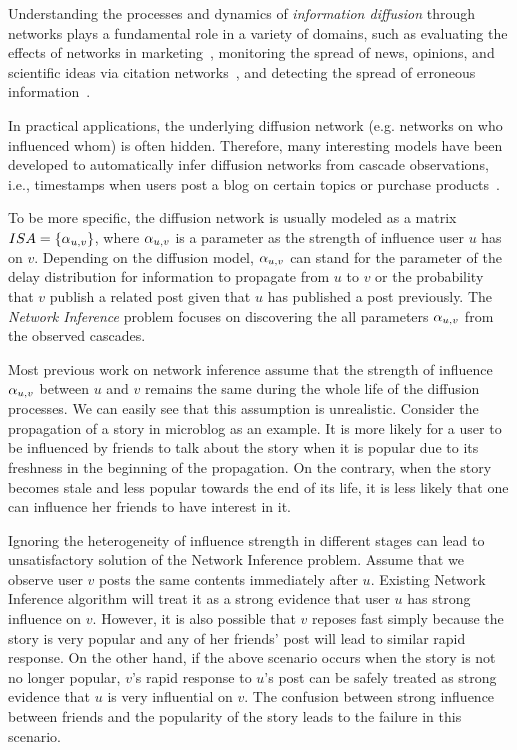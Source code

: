 
\quad Understanding the processes and dynamics of \emph{information diffusion} through networks plays a fundamental role in a variety of domains, such as evaluating the effects of networks in marketing~\cite{domingos:2001,kempe:2003,leskovec:2007a}, monitoring the spread of news, opinions, and scientific ideas via citation networks~\cite{adar:2004,gruhl:2004,leskovec:2005}, and detecting the spread of erroneous information~\cite{dong:2009}.

In practical applications, the underlying diffusion network (e.g. networks on who influenced whom) is often hidden. Therefore, many interesting models have been developed to automatically infer diffusion networks from cascade observations, i.e., timestamps when users post a blog on certain topics or purchase products~\cite{gomez-rodriguez:leskovec:krause:inferring,gomez-rodriguez:balduzzi:schoelkopf:uncovering,yang:zha:mutualExciting,zhou:zha:song:mutualExciting,Wang:Hu:Philip:Li:multiAspect,Daneshmand:Gomez:Song:recovery14,Du:Song:Song:Alex:HeterogeneousInf,Du:Song:Woo:Zha:topicCascade}. 


To be more specific, the diffusion network is usually modeled as a matrix $ISA=\{\alpha_{u,v}\}$, where $\alpha_{u,v}$ is a parameter as the strength of influence user $u$ has on $v$. Depending on the diffusion model, $\alpha_{u,v}$ can stand for the parameter of the delay distribution for information to propagate from $u$ to $v$ or the probability that $v$ publish a related post given that $u$ has published a post previously. The \emph{Network Inference} problem focuses on discovering the all parameters $\alpha_{u,v}$ from the observed cascades. 



Most previous work on network inference assume that the strength of influence $\alpha_{u,v}$ between $u$ and $v$ remains the same during the whole life of the diffusion processes. We can easily see that this assumption is unrealistic. Consider the propagation of a story in microblog as an example. It is more likely for a user to be influenced by friends to talk about the story when it is popular due to its freshness in the beginning of the propagation. On the contrary, when the story becomes stale and less popular towards the end of its life, it is less likely that one can influence her friends to have interest in it. 


Ignoring the heterogeneity of influence strength in different stages can lead to unsatisfactory solution of the Network Inference problem. Assume that we observe user $v$ posts the same contents immediately after $u$. Existing Network Inference algorithm will treat it as a strong evidence that user $u$ has strong influence on $v$. However, it is also possible that $v$ reposes fast simply because the story is very popular and any of her friends' post will lead to similar rapid response. On the other hand, if the above scenario occurs when the story is not no longer popular, $v$'s rapid response to $u$'s post can be safely treated as strong evidence that $u$ is very influential on $v$. The confusion between strong influence between friends and the popularity of the story leads to the failure in this scenario.  


